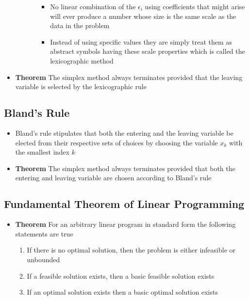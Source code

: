 \documentclass[11pt]{article}
\begin{document}
\begin{itemize}
\begin{itemize}
\begin{itemize}
\begin{itemize}
\item No linear combination of the \(\epsilon_i\) using coefficients that might arise will ever produce a number whose size is the same scale as the data in the problem
\item Instead of using specific values they are simply treat them as abstract symbols having these scale properties which is called the lexicographic method
\end{itemize}
\end{itemize}
\end{itemize}

\item \textbf{Theorem} The simplex method always terminates provided that the leaving variable is selected by the lexicographic rule
\end{itemize}

\subsection{Bland's Rule}
\label{sec:org651d082}
\begin{itemize}
\item Bland's rule stipulates that both the entering and the leaving variable be elected from their respective sets of choices by choosing the variable \(x_k\) with the smallest index \(k\)
\item \textbf{Theorem} The simplex method always terminates provided that both the entering and leaving variable are chosen according to Bland's rule
\end{itemize}

\subsection{Fundamental Theorem of Linear Programming}
\label{sec:org9198de7}
\begin{itemize}
\item \textbf{Theorem} For an arbitrary linear program in standard form the following statements are true
\begin{enumerate}
\item If there is no optimal solution, then the problem is either infeasible or unbounded
\item If a feasible solution exists, then a basic feasible solution exists
\item If an optimal solution exists then a basic optimal solution exists
\end{enumerate}
\end{itemize}
\end{document}
